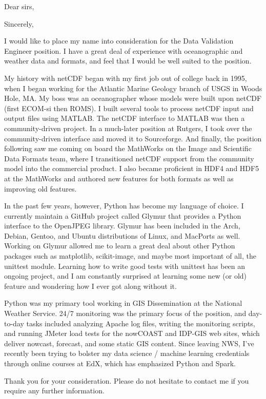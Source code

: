 \documentclass[11pt]{moderncv}  %
\begin{document}
\makecvtitle

\opening{Dear sirs,}
\closing{Sincerely,}


\makelettertitle

I would like to place my name into consideration for the Data Validation Engineer position.   I have a great deal of experience with oceanographic and weather data and formats, and feel that I would be well suited to the position.

My history with netCDF began with my first job out of college back in 1995, 
when I began working for the Atlantic Marine Geology branch of USGS in Woods Hole,
MA.  My boss was an oceanographer whose models were built upon netCDF (first ECOM-si then ROMS).  I built several tools to process netCDF input and output files using
MATLAB.  The netCDF interface to MATLAB was then a community-driven project.
In a much-later position at Rutgers, I took over the community-driven interface
and moved it to Sourceforge.  And finally, the position following saw me
coming on board the MathWorks on the Image and Scientific Data Formats team, where I transitioned netCDF support from the community model into the commercial product.  I also became proficient in HDF4 and HDF5 at the MathWorks and authored new features for both formats as well as improving old features.

In the past few years, however, Python has become my language of choice.  I currently
maintain a GitHub project called Glymur that provides a Python interface
to the OpenJPEG library.  Glymur has been included in the Arch, Debian,
Gentoo, and Ubuntu distributions of Linux, and MacPorts as well.
Working on Glymur allowed me to learn a great deal about other Python
packages such as matplotlib, scikit-image, and maybe most important of
all, the unittest module.  Learning how to write good tests with unittest
has been an ongoing project, and I am constantly surprised at learning
some new (or old) feature and wondering how I ever got along without it.

Python was my primary tool working in GIS Dissemination at the National
Weather Service.  24/7 monitoring was the primary focus of the position,
and day-to-day tasks included analyzing Apache log files, writing the
monitoring scripts, and running JMeter load tests for the nowCOAST and
IDP-GIS web sites, which deliver nowcast, forecast, and some static
GIS content.  Since leaving NWS, I've recently been trying to bolster
my data science / machine learning credentials through online courses
at EdX, which has emphasized Python and Spark.

Thank you for your consideration.  Please do not hesitate to contact
me if you require any further information.

\makeletterclosing
\end{document}
